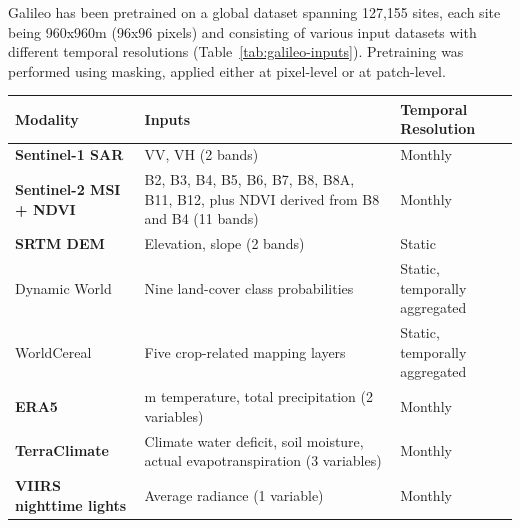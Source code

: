 \documentclass[a4paper,12pt]{article}
\makeatletter
\newenvironment{placedtable}
  {\par\addvspace{\intextsep}\noindent\begin{minipage}{\linewidth}\def\@captype{table}}
  {\end{minipage}\par\addvspace{\intextsep}}
\makeatother
\begin{document}
Galileo has been pretrained on a global dataset spanning 127,155 sites, each site being 960x960m (96x96 pixels) and consisting of various input datasets with different temporal resolutions (Table~\ref{tab:galileo-inputs}). Pretraining was performed using masking, applied either at pixel-level or at patch-level.

\begin{placedtable}
  \centering
  \caption{Input datasets and temporal resolutions used in Galileo pretraining \citep{tsengGalileoLearningGlobal2025}. Modalities in bold are used in this thesis.}
  \label{tab:galileo-inputs}
  \small
  \begin{tabularx}{\textwidth}{@{}>{\raggedright\arraybackslash}p{} >{\raggedright\arraybackslash}X >{\raggedright\arraybackslash}p{}@{}}
    \hline
    \textbf{Modality}                    & \textbf{Inputs}                                                                             & \textbf{Temporal Resolution}  \\
    \hline
    \textbf{Sentinel-1 SAR}              & VV, VH (2 bands)                                                                            & Monthly                       \\[0.4em]
    \textbf{Sentinel-2 MSI + \acs{NDVI}} & B2, B3, B4, B5, B6, B7, B8, B8A, B11, B12, plus \ac{NDVI} derived from B8 and B4 (11 bands) & Monthly                       \\[0.4em]
    \textbf{SRTM \ac{DEM}}               & Elevation, slope (2 bands)                                                                  & Static                        \\[0.4em]
    Dynamic World                        & Nine land-cover class probabilities                                                         & Static, temporally aggregated \\[0.4em]
    WorldCereal                          & Five crop-related mapping layers                                                            & Static, temporally aggregated \\[0.4em]
    \textbf{ERA5}                        & 2 m temperature, total precipitation (2 variables)                                          & Monthly                       \\[0.4em]
    \textbf{TerraClimate}                & Climate water deficit, soil moisture, actual evapotranspiration (3 variables)               & Monthly                       \\[0.4em]
    \textbf{VIIRS nighttime lights}      & Average radiance (1 variable)                                                               & Monthly                       \\[0.4em]

\end{tabularx}
\end{placedtable}
\end{document}
